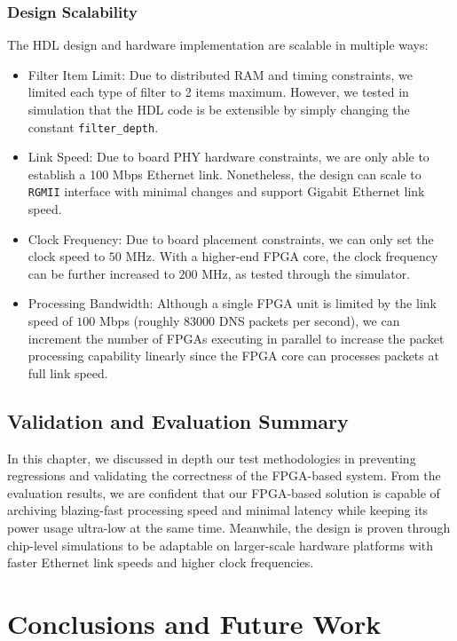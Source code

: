 \documentclass[a4paper]{report}
\newcommand{\code}{\texttt}
\begin{document}
\subsection{Design Scalability}

The HDL design and hardware implementation are scalable in multiple ways:

\begin{itemize}
    \item Filter Item Limit: Due to distributed RAM and timing constraints, we limited each type of filter to 2 items maximum. However, we tested in simulation that the HDL code is be extensible by simply changing the constant \code{filter\_depth}.
    \item Link Speed: Due to board PHY hardware constraints, we are only able to establish a 100 Mbps Ethernet link. Nonetheless, the design can scale to \code{RGMII} interface with minimal changes and support Gigabit Ethernet link speed.
    \item Clock Frequency: Due to board placement constraints, we can only set the clock speed to $50$ MHz. With a higher-end FPGA core, the clock frequency can be further increased to $200$ MHz, as tested through the simulator.
    \item Processing Bandwidth: Although a single FPGA unit is limited by the link speed of $100$ Mbps (roughly $83000$ DNS packets per second), we can increment the number of FPGAs executing in parallel to increase the packet processing capability linearly since the FPGA core can processes packets at full link speed.
\end{itemize}

\section{Validation and Evaluation Summary}

In this chapter, we discussed in depth our test methodologies in preventing regressions and validating the correctness of the FPGA-based system. From the evaluation results, we are confident that our FPGA-based solution is capable of archiving blazing-fast processing speed and minimal latency while keeping its power usage ultra-low at the same time. Meanwhile, the design is proven through chip-level simulations to be adaptable on larger-scale hardware platforms with faster Ethernet link speeds and higher clock frequencies.

\chapter{Conclusions and Future Work}
\end{document}
